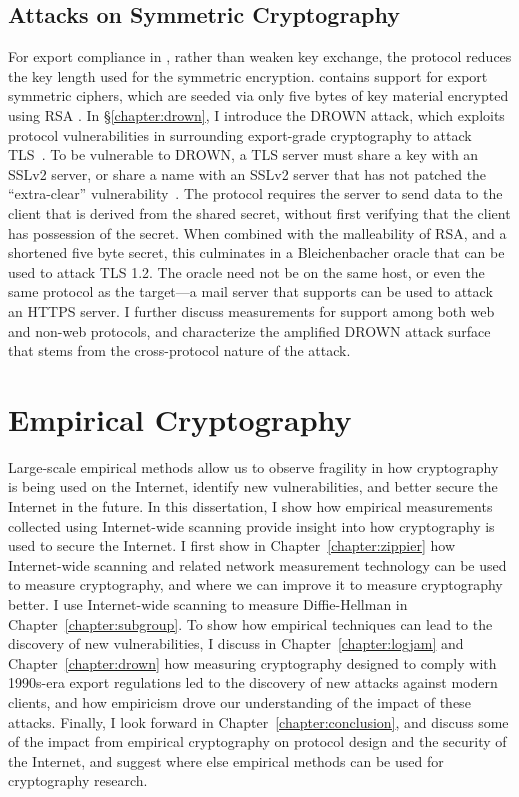 \subsection{Attacks on Symmetric Cryptography}

For export compliance in \ssltwo, rather than weaken key exchange, the
protocol reduces the key length used for the symmetric encryption.
\ssltwo contains support for export symmetric ciphers, which are seeded via
only five bytes of key material encrypted using RSA \PKCS. In
\S\ref{chapter:drown}, I introduce the DROWN attack, which exploits protocol
vulnerabilities in \ssltwo surrounding export-grade cryptography to attack
TLS~\cite{drown-2016}. To be vulnerable to DROWN, a TLS server must share a
key with an SSLv2 server, or share a name with an SSLv2 server that has not
patched the ``extra-clear'' vulnerability~\cite{drown-2016,cve-2016-0701}.
The \ssltwo protocol requires the server to send data to the client that is
derived from the shared secret, without first verifying that the client has
possession of the secret. When combined with the malleability of RSA, and a
shortened five byte secret, this culminates in a Bleichenbacher oracle that
can be used to attack TLS 1.2. The \ssltwo oracle need not be on the same
host, or even the same protocol as the target---a mail server that supports
\starttls can be used to attack an HTTPS server. I further discuss
measurements for \ssltwo support among both web and non-web protocols, and
characterize the amplified DROWN attack surface that stems from the
cross-protocol nature of the attack.

\section{Empirical Cryptography}

Large-scale empirical methods allow us to observe fragility in how
cryptography is being used on the Internet, identify new vulnerabilities, and
better secure the Internet in the future. In this dissertation, I show how
empirical measurements collected using Internet-wide scanning provide insight
into how cryptography is used to secure the Internet. I first show in
Chapter~\ref{chapter:zippier} how Internet-wide scanning and related network
measurement technology can be used to measure cryptography, and where we can
improve it to measure cryptography better. I use Internet-wide scanning to
measure Diffie-Hellman in Chapter~\ref{chapter:subgroup}. To show how
empirical techniques can lead to the discovery of new vulnerabilities, I
discuss in Chapter~\ref{chapter:logjam} and Chapter~\ref{chapter:drown} how
measuring cryptography designed to comply with 1990s-era export regulations
led to the discovery of new attacks against modern clients, and how
empiricism drove our understanding of the impact of these attacks. Finally, I look
forward in Chapter~\ref{chapter:conclusion}, and discuss some of the impact from
empirical cryptography on protocol design and the security of the Internet, and suggest
where else empirical methods can be used for cryptography research.

